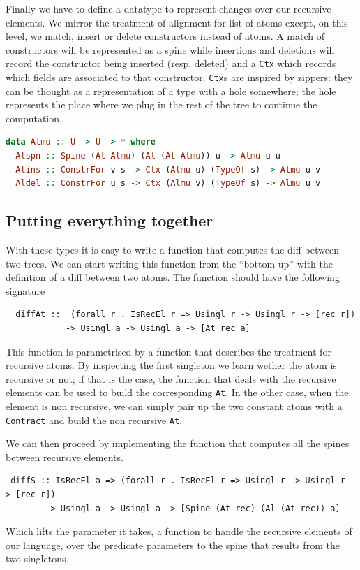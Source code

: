 \documentclass[11pt]{article}
\begin{document}
Finally we have to define a datatype to represent changes over our recursive 
elements. We mirror the treatment of alignment for list of atoms except, on this level, we 
match, insert or delete constructors instead of atoms. 
A match of constructors will be represented as a spine while insertions and 
deletions will record the constructor being inserted (resp. deleted) and a 
\texttt{Ctx} which records which fields are associated to that constructor.
\texttt{Ctx}s are inspired by zippers: they can be thought as a representation 
of a  type with a hole somewhere; the hole represents the place where we 
plug in the rest of the tree to continue the computation.
\begin{lstlisting}[language=haskell]
data Almu :: U -> U -> * where
  Alspn :: Spine (At Almu) (Al (At Almu)) u -> Almu u u
  Alins :: ConstrFor v s -> Ctx (Almu u) (TypeOf s) -> Almu u v
  Aldel :: ConstrFor u s -> Ctx (Almu v) (TypeOf s) -> Almu u v
\end{lstlisting}


\subsection{Putting everything together}\label{putting everything together}

With these types it is easy to write a function that computes the diff between 
two trees.
We can start writing this function from the ``bottom up'' 
with the definition of a diff between two atoms. The function should have the 
following signature
\begin{lstlisting}
  diffAt ::  (forall r . IsRecEl r => Usingl r -> Usingl r -> [rec r])
            -> Usingl a -> Usingl a -> [At rec a]
\end{lstlisting}
This function is parametrised by a function that describes the treatment for 
recursive atoms. By inspecting the first singleton we learn wether the atom is 
recursive or not; if that is the case, the function that deals with the 
recursive elements can be used to build the corresponding \texttt{At}. In the 
other case, when the element is non recursive, we can simply pair up the two 
constant atoms with a \texttt{Contract} and build the non recursive \texttt{At}.

We can then proceed by implementing the function that computes all the spines 
between recursive elements.
\begin{lstlisting}
 diffS :: IsRecEl a => (forall r . IsRecEl r => Usingl r -> Usingl r -> [rec r])
        -> Usingl a -> Usingl a -> [Spine (At rec) (Al (At rec)) a]
\end{lstlisting}
Which lifts the parameter it takes, a function to handle the 
recursive elements of our language, over the predicate parameters to the spine that results 
from the two singletons.
\end{document}
